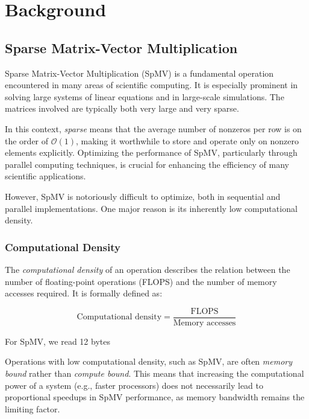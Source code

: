 \chapter{Background}

\section{Sparse Matrix-Vector Multiplication}

Sparse Matrix-Vector Multiplication (SpMV) is a fundamental operation encountered in many areas of scientific computing. It is especially prominent in solving large systems of linear equations and in large-scale simulations. The matrices involved are typically both very large and very sparse. 

In this context, \textit{sparse} means that the average number of nonzeros per row is on the order of \(\mathcal{O}(1)\), making it worthwhile to store and operate only on nonzero elements explicitly. Optimizing the performance of SpMV, particularly through parallel computing techniques, is crucial for enhancing the efficiency of many scientific applications.

However, SpMV is notoriously difficult to optimize, both in sequential and parallel implementations. One major reason is its inherently low computational density.

\subsection{Computational Density}

The \textit{computational density} of an operation describes the relation between the number of floating-point operations (FLOPS) and the number of memory accesses required. It is formally defined as:

\begin{equation}
    \text{Computational density} = \frac{\text{FLOPS}}{\text{Memory accesses}}
    \label{eq:computationaldensity}
\end{equation}

For SpMV, we read 12 bytes  

Operations with low computational density, such as SpMV, are often \textit{memory bound} rather than \textit{compute bound}. This means that increasing the computational power of a system (e.g., faster processors) does not necessarily lead to proportional speedups in SpMV performance, as memory bandwidth remains the limiting factor.


